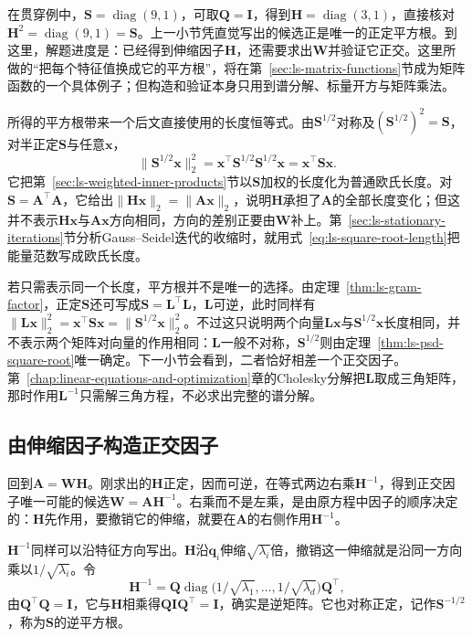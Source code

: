 在贯穿例中，$\bm S=\operatorname{diag}(9,1)$，可取$\bm Q=\bm I$，得到$\bm H=\operatorname{diag}(3,1)$，直接核对$\bm H^2=\operatorname{diag}(9,1)=\bm S$。上一小节凭直觉写出的候选正是唯一的正定平方根。到这里，解题进度是：已经得到伸缩因子$\bm H$，还需要求出$\bm W$并验证它正交。这里所做的“把每个特征值换成它的平方根”，将在第~\ref{sec:ls-matrix-functions}节成为矩阵函数的一个具体例子；但构造和验证本身只用到谱分解、标量开方与矩阵乘法。

所得的平方根带来一个后文直接使用的长度恒等式。由$\bm S^{1/2}$对称及$(\bm S^{1/2})^2=\bm S$，对半正定$\bm S$与任意$\bm x$，
\begin{equation}
 \lVert\bm S^{1/2}\bm x\rVert_2^2
 =\bm x^\top\bm S^{1/2}\bm S^{1/2}\bm x
 =\bm x^\top\bm S\bm x .
 \label{eq:ls-square-root-length}
\end{equation}
它把第~\ref{sec:ls-weighted-inner-products}节以$\bm S$加权的长度化为普通欧氏长度。对$\bm S=\bm A^\top\bm A$，它给出$\lVert\bm H\bm x\rVert_2=\lVert\bm A\bm x\rVert_2$，说明$\bm H$承担了$\bm A$的全部长度变化；但这并不表示$\bm H\bm x$与$\bm A\bm x$方向相同，方向的差别正要由$\bm W$补上。第~\ref{sec:ls-stationary-iterations}节分析Gauss--Seidel迭代的收缩时，就用式~\eqref{eq:ls-square-root-length}把能量范数写成欧氏长度。

若只需表示同一个长度，平方根并不是唯一的选择。由定理~\ref{thm:ls-gram-factor}，正定$\bm S$还可写成$\bm S=\bm L^\top\bm L$，$\bm L$可逆，此时同样有$\lVert\bm L\bm x\rVert_2^2=\bm x^\top\bm S\bm x=\lVert\bm S^{1/2}\bm x\rVert_2^2$。不过这只说明两个向量$\bm L\bm x$与$\bm S^{1/2}\bm x$长度相同，并不表示两个矩阵对向量的作用相同：$\bm L$一般不对称，$\bm S^{1/2}$则由定理~\ref{thm:ls-psd-square-root}唯一确定。下一小节会看到，二者恰好相差一个正交因子。第~\ref{chap:linear-equations-and-optimization}章的Cholesky分解把$\bm L$取成三角矩阵，那时作用$\bm L^{-1}$只需解三角方程，不必求出完整的谱分解。

\subsection{由伸缩因子构造正交因子}
\label{sec:ls-polar-orthogonal-factor}

回到$\bm A=\bm W\bm H$。刚求出的$\bm H$正定，因而可逆，在等式两边右乘$\bm H^{-1}$，得到正交因子唯一可能的候选$\bm W=\bm A\bm H^{-1}$。右乘而不是左乘，是由原方程中因子的顺序决定的：$\bm H$先作用，要撤销它的伸缩，就要在$\bm A$的右侧作用$\bm H^{-1}$。

$\bm H^{-1}$同样可以沿特征方向写出。$\bm H$沿$\bm q_i$伸缩$\sqrt{\lambda_i}$倍，撤销这一伸缩就是沿同一方向乘以$1/\sqrt{\lambda_i}$。令
\[
 \bm H^{-1}=\bm Q\operatorname{diag}\bigl(1/\sqrt{\lambda_1},\ldots,1/\sqrt{\lambda_d}\bigr)\bm Q^\top ,
\]
由$\bm Q^\top\bm Q=\bm I$，它与$\bm H$相乘得$\bm Q\bm I\bm Q^\top=\bm I$，确实是逆矩阵。它也对称正定，记作$\bm S^{-1/2}$，称为$\bm S$的逆平方根。

